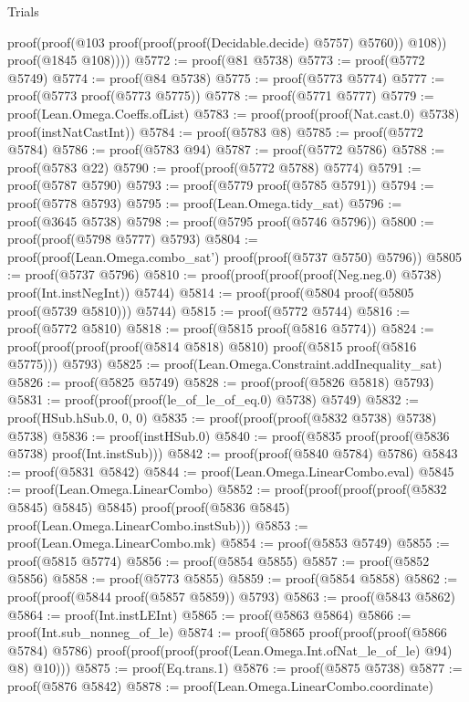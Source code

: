\begin{lexlean}{Trials}
\begin{coremodule}
                proof(proof(@103 proof(proof(proof(Decidable.decide) @5757) @5760)) @108))
              proof(@1845 @108))))
@5772 := proof(@81 @5738)
@5773 := proof(@5772 @5749)
@5774 := proof(@84 @5738)
@5775 := proof(@5773 @5774)
@5777 := proof(@5773 proof(@5773 @5775))
@5778 := proof(@5771 @5777)
@5779 := proof(Lean.Omega.Coeffs.ofList)
@5783 := proof(proof(proof(Nat.cast.{0}) @5738) proof(instNatCastInt))
@5784 := proof(@5783 @8)
@5785 := proof(@5772 @5784)
@5786 := proof(@5783 @94)
@5787 := proof(@5772 @5786)
@5788 := proof(@5783 @22)
@5790 := proof(proof(@5772 @5788) @5774)
@5791 := proof(@5787 @5790)
@5793 := proof(@5779 proof(@5785 @5791))
@5794 := proof(@5778 @5793)
@5795 := proof(Lean.Omega.tidy_sat)
@5796 := proof(@3645 @5738)
@5798 := proof(@5795 proof(@5746 @5796))
@5800 := proof(proof(@5798 @5777) @5793)
@5804 := proof(proof(Lean.Omega.combo_sat') proof(proof(@5737 @5750) @5796))
@5805 := proof(@5737 @5796)
@5810 := proof(proof(proof(proof(Neg.neg.{0}) @5738) proof(Int.instNegInt)) @5744)
@5814 := proof(proof(@5804 proof(@5805 proof(@5739 @5810))) @5744)
@5815 := proof(@5772 @5744)
@5816 := proof(@5772 @5810)
@5818 := proof(@5815 proof(@5816 @5774))
@5824 := proof(proof(proof(proof(@5814 @5818) @5810) proof(@5815 proof(@5816 @5775))) @5793)
@5825 := proof(Lean.Omega.Constraint.addInequality_sat)
@5826 := proof(@5825 @5749)
@5828 := proof(proof(@5826 @5818) @5793)
@5831 := proof(proof(proof(le_of_le_of_eq.{0}) @5738) @5749)
@5832 := proof(HSub.hSub.{0, 0, 0})
@5835 := proof(proof(proof(@5832 @5738) @5738) @5738)
@5836 := proof(instHSub.{0})
@5840 := proof(@5835 proof(proof(@5836 @5738) proof(Int.instSub)))
@5842 := proof(proof(@5840 @5784) @5786)
@5843 := proof(@5831 @5842)
@5844 := proof(Lean.Omega.LinearCombo.eval)
@5845 := proof(Lean.Omega.LinearCombo)
@5852 := proof(proof(proof(proof(@5832 @5845) @5845) @5845)
      proof(proof(@5836 @5845) proof(Lean.Omega.LinearCombo.instSub)))
@5853 := proof(Lean.Omega.LinearCombo.mk)
@5854 := proof(@5853 @5749)
@5855 := proof(@5815 @5774)
@5856 := proof(@5854 @5855)
@5857 := proof(@5852 @5856)
@5858 := proof(@5773 @5855)
@5859 := proof(@5854 @5858)
@5862 := proof(proof(@5844 proof(@5857 @5859)) @5793)
@5863 := proof(@5843 @5862)
@5864 := proof(Int.instLEInt)
@5865 := proof(@5863 @5864)
@5866 := proof(Int.sub_nonneg_of_le)
@5874 := proof(@5865
      proof(proof(proof(@5866 @5784) @5786)
          proof(proof(proof(proof(Lean.Omega.Int.ofNat_le_of_le) @94) @8) @10)))
@5875 := proof(Eq.trans.{1})
@5876 := proof(@5875 @5738)
@5877 := proof(@5876 @5842)
@5878 := proof(Lean.Omega.LinearCombo.coordinate)

\end{coremodule}
\end{lexlean}
